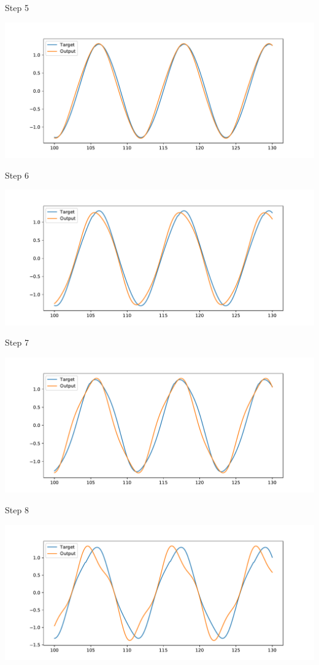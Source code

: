 \documentclass[presentation]{beamer}
\begin{document}
\begin{frame}[label={sec:orgd95f12a}]{Step 5}
\begin{center}
\includegraphics[width=.9\linewidth]{./step5.pdf}
\end{center}
\end{frame}
\begin{frame}[label={sec:org3f77254}]{Step 6}
\begin{center}
\includegraphics[width=.9\linewidth]{./step6.pdf}
\end{center}
\end{frame}
\begin{frame}[label={sec:org082e0c6}]{Step 7}
\begin{center}
\includegraphics[width=.9\linewidth]{./step7.pdf}
\end{center}
\end{frame}
\begin{frame}[label={sec:org4249204}]{Step 8}
\begin{center}
\includegraphics[width=.9\linewidth]{./step8.pdf}
\end{center}
\end{frame}
\end{document}
